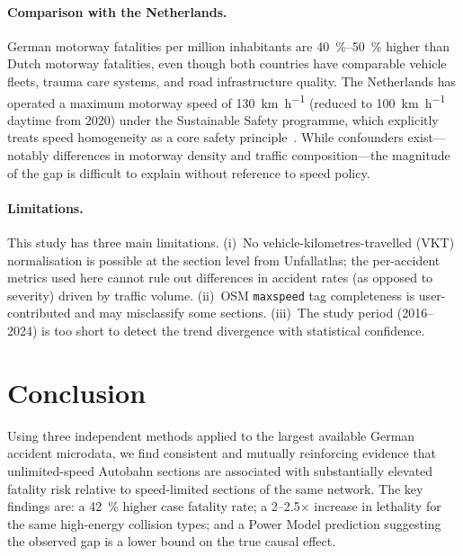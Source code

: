 \documentclass[aps,prl,twocolumn,superscriptaddress,longbibliography]{revtex4-2}
\begin{document}
\paragraph{Comparison with the Netherlands.}
German motorway fatalities per million inhabitants are \SI{40}{\percent}--\SI{50}{\percent}
higher than Dutch motorway fatalities, even though both countries have comparable
vehicle fleets, trauma care systems, and road infrastructure quality.
The Netherlands has operated a maximum motorway speed of \SI{130}{\kilo\metre\per\hour}
(reduced to \SI{100}{\kilo\metre\per\hour} daytime from 2020) under the
Sustainable Safety programme, which explicitly treats speed homogeneity as
a core safety principle~\cite{Wegman2008}.
While confounders exist---notably differences in motorway density and traffic
composition---the magnitude of the gap is difficult to explain without
reference to speed policy.

\paragraph{Limitations.}
This study has three main limitations.
(i)~No vehicle-kilometres-travelled (VKT) normalisation is possible at the
section level from Unfallatlas; the per-accident metrics used here cannot
rule out differences in accident rates (as opposed to severity) driven by
traffic volume.
(ii)~OSM \texttt{maxspeed} tag completeness is user-contributed and may
misclassify some sections.
(iii)~The study period (2016--2024) is too short to detect the trend divergence
with statistical confidence.

\section{Conclusion}

Using three independent methods applied to the largest available German accident
microdata, we find consistent and mutually reinforcing evidence that
unlimited-speed Autobahn sections are associated with substantially elevated
fatality risk relative to speed-limited sections of the same network.
The key findings are: a \SI{42}{\percent} higher case fatality rate; a 2--2.5$\times$
increase in lethality for the same high-energy collision types; and a Power Model
prediction suggesting the observed gap is a lower bound on the true causal effect.
\end{document}
